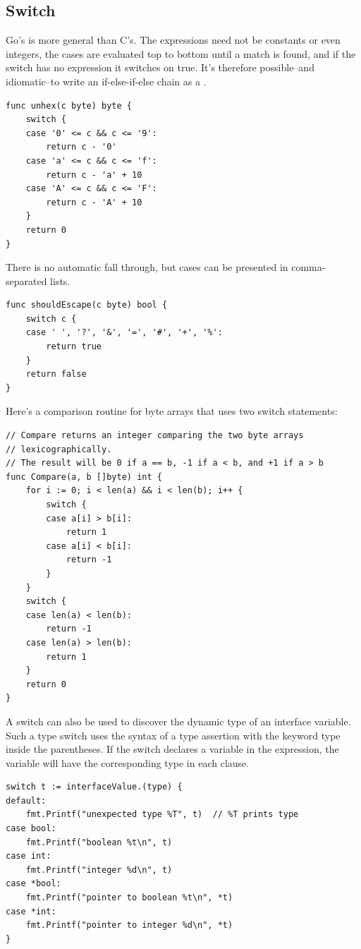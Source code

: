 \subsection{Switch}
Go's  is more general than C's. The expressions need not be
constants or even integers, the cases are evaluated top to bottom until
a match is found, and if the switch has no expression it switches on
true. It's therefore possible--and idiomatic--to write an if-else-if-else
chain as a .
\begin{lstlisting}
func unhex(c byte) byte {
    switch {
    case '0' <= c && c <= '9':
        return c - '0'
    case 'a' <= c && c <= 'f':
        return c - 'a' + 10
    case 'A' <= c && c <= 'F':
        return c - 'A' + 10
    }
    return 0
}
\end{lstlisting}
There is no automatic fall through, but cases can be presented in comma-separated lists.

\begin{lstlisting}
func shouldEscape(c byte) bool {
    switch c {
    case ' ', '?', '&', '=', '#', '+', '%':
        return true
    }
    return false
}
\end{lstlisting}
Here's a comparison routine for byte arrays that uses two switch statements:

\begin{lstlisting}
// Compare returns an integer comparing the two byte arrays
// lexicographically.
// The result will be 0 if a == b, -1 if a < b, and +1 if a > b
func Compare(a, b []byte) int {
    for i := 0; i < len(a) && i < len(b); i++ {
        switch {
        case a[i] > b[i]:
            return 1
        case a[i] < b[i]:
            return -1
        }
    }
    switch {
    case len(a) < len(b):
        return -1
    case len(a) > len(b):
        return 1
    }
    return 0
}
\end{lstlisting}
A switch can also be used to discover the dynamic type of an interface
variable. Such a type switch uses 
the syntax of a type assertion with the keyword type inside the
parentheses. If the switch declares a variable in the expression, the
variable will have the corresponding type in each clause.

\begin{lstlisting}
switch t := interfaceValue.(type) {
default:
    fmt.Printf("unexpected type %T", t)  // %T prints type
case bool:
    fmt.Printf("boolean %t\n", t)
case int:
    fmt.Printf("integer %d\n", t)
case *bool:
    fmt.Printf("pointer to boolean %t\n", *t)
case *int:
    fmt.Printf("pointer to integer %d\n", *t)
}
\end{lstlisting}

